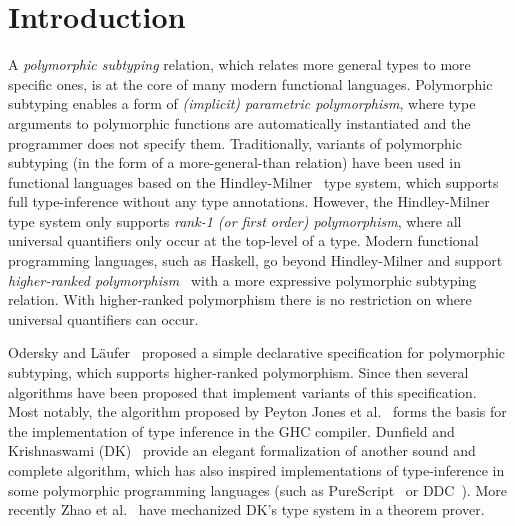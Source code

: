 \section{Introduction}

A \emph{polymorphic subtyping} relation, which relates more general
types to more specific ones, is at the core of many modern functional
languages. Polymorphic subtyping enables a form of
\emph{(implicit) parametric polymorphism}, where type arguments to polymorphic
functions are automatically instantiated and the programmer does not specify them.
Traditionally, variants of polymorphic subtyping (in the form of a more-general-than relation)
have been used in functional languages based on the
Hindley-Milner~\citep{hindley1969principal,milner1978theory,damas1982principal}
type system, which supports full type-inference without any type annotations.
However, the Hindley-Milner type system only supports \emph{rank-1 (or first order)
polymorphism}, where all universal quantifiers only occur at the top-level
of a type.  Modern functional programming languages, such as Haskell, go beyond
Hindley-Milner and support \emph{higher-ranked polymorphism}~\citep{odersky1996putting,jones2007practical}
with a more expressive
polymorphic subtyping relation. With higher-ranked
polymorphism there is no restriction on where universal quantifiers can occur.

Odersky and L\"aufer~\citep{odersky1996putting} proposed a
simple declarative specification for polymorphic subtyping, which supports higher-ranked polymorphism.
Since then several
algorithms have been proposed that implement variants of this specification. Most
notably, the algorithm proposed by Peyton Jones et al.~\citep{jones2007practical} forms the basis
for the implementation of type inference in the GHC compiler.
Dunfield and Krishnaswami (DK)~\citep{dunfield2013complete} provide an elegant
formalization of another sound and complete algorithm, which has
also inspired implementations of type-inference in some polymorphic
programming languages (such as PureScript~\citep{PureScript} or DDC~\citep{Disciple}).
More recently Zhao et al.~\citep{zhao19mechanical} have mechanized DK's type system in a theorem prover.


